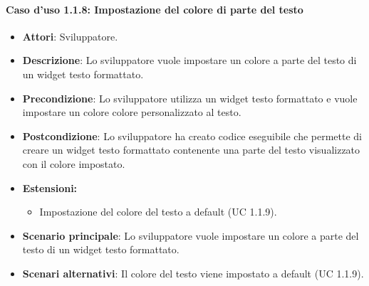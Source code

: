 \paragraph{Caso d'uso 1.1.8: Impostazione del colore di parte del testo}
\begin{itemize}
\item\textbf{Attori}: Sviluppatore.
\item\textbf{Descrizione}: Lo sviluppatore vuole impostare un colore a parte del testo di un widget testo formattato.
\item\textbf{Precondizione}: Lo sviluppatore utilizza un widget testo formattato e vuole impostare un colore colore personalizzato al testo.
\item\textbf{Postcondizione}: Lo sviluppatore ha creato codice eseguibile che permette di creare un widget testo formattato contenente una parte del testo visualizzato con il colore impostato.
\item\textbf{Estensioni:}
	\begin{itemize}
		\item Impostazione del colore del testo a default (UC 1.1.9).
		\end{itemize}
\item\textbf{Scenario principale}: Lo sviluppatore vuole impostare un colore a parte del testo di un widget testo formattato.
\item\textbf{Scenari alternativi}: Il colore del testo viene impostato a default (UC 1.1.9).
\end{itemize}